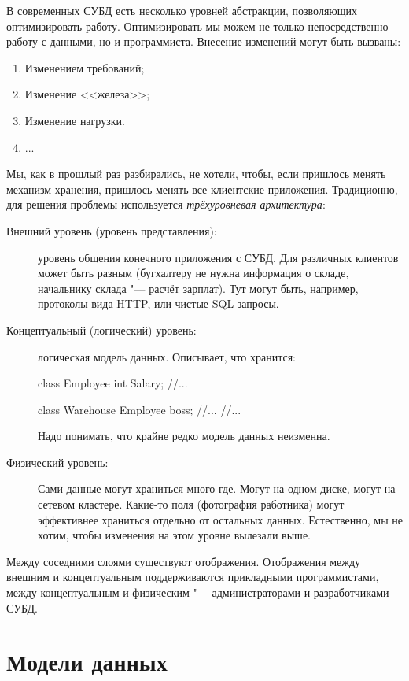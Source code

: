 В современных СУБД есть несколько уровней абстракции, позволяющих оптимизировать работу.
Оптимизировать мы можем не только непосредственно работу с данными, но и программиста.
Внесение изменений могут быть вызваны:
\begin{enumerate}
	\item Изменением требований;
	\item Изменение <<железа>>;
	\item Изменение нагрузки.
	\item ...
\end{enumerate}

Мы, как в прошлый раз разбирались, не хотели, чтобы, если пришлось менять механизм хранения, пришлось менять все клиентские приложения.
Традиционно, для решения проблемы используется \textit{трёхуровневая архитектура}:
\begin{description}
\item[Внешний уровень (уровень представления):] уровень общения конечного приложения с СУБД.
	Для различных клиентов может быть разным (бугхалтеру не нужна информация о складе, начальнику склада "--- расчёт зарплат).
	Тут могут быть, например, протоколы вида HTTP, или чистые SQL-запросы.

\item[Концептуальный (логический) уровень:] логическая модель данных.
	Описывает, что хранится:
	\begin{javacode}
	class Employee {
		int Salary;
		//...
	}

	class Warehouse {
		Employee boss;
		//...
	}
	//...
	\end{javacode}
	Надо понимать, что крайне редко модель данных неизменна.
	
\item[Физический уровень:]
	Сами данные могут храниться много где.
	Могут на одном диске, могут на сетевом кластере.
	Какие-то поля (фотография работника) могут эффективнее храниться отдельно от остальных данных.
	Естественно, мы не хотим, чтобы изменения на этом уровне вылезали выше.
\end{description}
Между соседними слоями существуют отображения.
Отображения между внешним и концептуальным поддерживаются прикладными программистами,
между концептуальным и физическим "--- администраторами и разработчиками СУБД.

\chapter{Модели данных}

